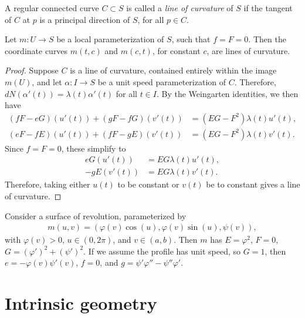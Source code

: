 \begin{defn}
    A regular connected curve $C \subset S$ is called a \emph{line of curvature} of $S$ if the tangent of $C$ at $p$ is a principal direction of $S$, for all $p \in C$.
\end{defn}

\begin{prop}
    Let $m: U \to S$ be a local parameterization of $S$, such that $f = F = 0$. Then the coordinate curves $m(t, c)$ and $m(c, t)$, for constant $c$, are lines of curvature.
\end{prop}

\begin{proof}
    Suppose $C$ is a line of curvature, contained entirely within the image $m(U)$, and let $\alpha: I \to S$ be a unit speed parameterization of $C$. Therefore, $dN(\alpha'(t)) = \lambda(t)\alpha'(t)$ for all $t \in I$. By the Weingarten identities, we then have
    \begin{align*}
        (fF - eG)(u'(t)) + (gF - fG)(v'(t)) &= (EG - F^2)\lambda(t)u'(t), \\
        (eF - fE)(u'(t)) + (fF - gE)(v'(t)) &= (EG - F^2)\lambda(t)v'(t).
    \end{align*}
    Since $f = F = 0$, these simplify to
    \begin{align*}
        eG(u'(t)) &= EG\lambda(t)u'(t), \\
        -gE(v'(t)) &= EG\lambda(t)v'(t).
    \end{align*}
    Therefore, taking either $u(t)$ to be constant or $v(t)$ be to constant gives a line of curvature.
\end{proof}

\begin{prop}
    Consider a surface of revolution, parameterized by
    \begin{align*}
        m(u, v) = (\varphi(v)\cos(u), \varphi(v)\sin(u), \psi(v)),
    \end{align*}
    with $\varphi(v) > 0$, $u \in (0, 2\pi)$, and $v \in (a, b)$. Then $m$ has $E = \varphi^2$, $F = 0$, $G = (\varphi')^2 + (\psi')^2$. If we assume the profile has unit speed, so $G = 1$, then $e = -\varphi(v)\psi'(v)$, $f = 0$, and $g = \psi'\varphi'' - \psi''\varphi'$.
\end{prop}

\section{Intrinsic geometry}

